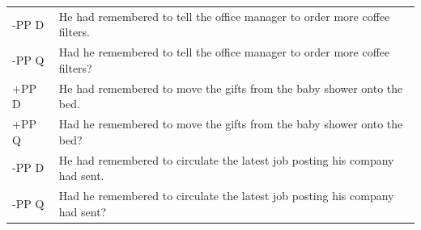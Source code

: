 \documentclass[12pt,oneside]{book}
\begin{document}
\begin{longtable}{ll}
\addlinespace
-PP D & He had remembered to tell the office manager to order more coffee filters.\\
-PP Q & Had he remembered to tell the office manager to order more coffee filters?\\
\addlinespace
+PP D & He had remembered to move the gifts from the baby shower onto the bed.\\
+PP Q & Had he remembered to move the gifts from the baby shower onto the bed?\\
\addlinespace
-PP D & He had remembered to circulate the latest job posting his company had sent.\\
-PP Q & Had he remembered to circulate the latest job posting his company had sent?\\*
\end{longtable}

\newpage
\end{document}
